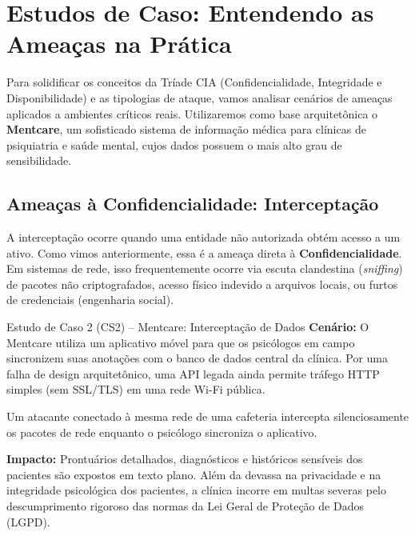 \documentclass[12pt,a4paper,twoside]{report}
\begin{document}
\section{Estudos de Caso: Entendendo as Ameaças na Prática}
Para solidificar os conceitos da Tríade CIA (Confidencialidade, Integridade e Disponibilidade) e as tipologias de ataque, vamos analisar cenários de ameaças aplicados a ambientes críticos reais. Utilizaremos como base arquitetônica o \textbf{Mentcare}, um sofisticado sistema de informação médica para clínicas de psiquiatria e saúde mental, cujos dados possuem o mais alto grau de sensibilidade.

\subsection{Ameaças à Confidencialidade: Interceptação}
A interceptação ocorre quando uma entidade não autorizada obtém acesso a um ativo. Como vimos anteriormente, essa é a ameaça direta à \textbf{Confidencialidade}. Em sistemas de rede, isso frequentemente ocorre via escuta clandestina (\textit{sniffing}) de pacotes não criptografados, acesso físico indevido a arquivos locais, ou furtos de credenciais (engenharia social).

\begin{block}{Estudo de Caso 2 (CS2) – Mentcare: Interceptação de Dados}
\textbf{Cenário:} O Mentcare utiliza um aplicativo móvel para que os psicólogos em campo sincronizem suas anotações com o banco de dados central da clínica. Por uma falha de design arquitetônico, uma API legada ainda permite tráfego HTTP simples (sem SSL/TLS) em uma rede Wi-Fi pública.

Um atacante conectado à mesma rede de uma cafeteria intercepta silenciosamente os pacotes de rede enquanto o psicólogo sincroniza o aplicativo.

\textbf{Impacto:} Prontuários detalhados, diagnósticos e históricos sensíveis dos pacientes são expostos em texto plano. Além da devassa na privacidade e na integridade psicológica dos pacientes, a clínica incorre em multas severas pelo descumprimento rigoroso das normas da Lei Geral de Proteção de Dados (LGPD).
\end{block}
\end{document}
